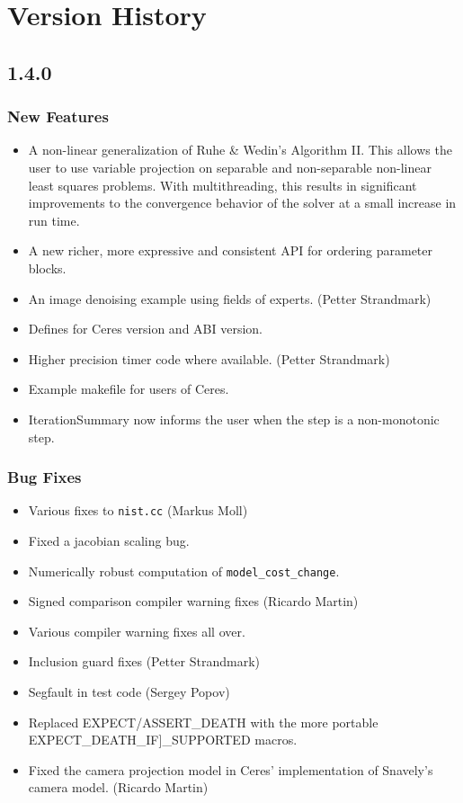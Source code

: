 
\chapter{Version History}
\section*{1.4.0}
\subsection{New Features}
\begin{itemize}
\item A non-linear generalization of Ruhe \& Wedin's Algorithm II. This allows the user to use variable projection on separable and non-separable non-linear least squares problems. With multithreading, this results in significant improvements to the convergence behavior of the solver at a small increase in run time.
\item A new richer, more expressive and consistent API for ordering parameter blocks.
\item An image denoising example using fields of experts. (Petter Strandmark)
\item Defines for Ceres version and ABI version.
\item Higher precision timer code where available. (Petter Strandmark)
\item Example makefile for users of Ceres.
\item IterationSummary now informs the user when the step is a non-monotonic step.
\end{itemize}
\subsection{Bug Fixes}
\begin{itemize}
\item Various fixes to \texttt{nist.cc} (Markus Moll)
\item Fixed a jacobian scaling bug. 
\item Numerically robust computation of \texttt{model\_cost\_change}.
\item Signed comparison compiler warning fixes (Ricardo Martin)
\item Various compiler warning fixes all over.
\item Inclusion guard fixes (Petter Strandmark)
\item Segfault in test code (Sergey Popov)
\item Replaced EXPECT/ASSERT\_DEATH with the more portable EXPECT\_DEATH\_IF]\_SUPPORTED macros.
\item Fixed the camera projection model in Ceres' implementation of Snavely's camera model. (Ricardo Martin)
\end{itemize}


